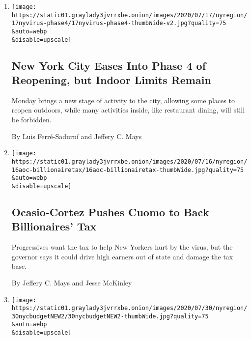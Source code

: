 \begin{enumerate}
\def\labelenumi{\arabic{enumi}.}
\item
  \href{/2020/07/17/nyregion/phase-4-nyc-reopen.html}{}

  \texttt{[image: https://static01.graylady3jvrrxbe.onion/images/2020/07/17/nyregion/17nyvirus-phase4/17nyvirus-phase4-thumbWide-v2.jpg?quality=75\\\&auto=webp\\\&disable=upscale]}

  \hypertarget{new-york-city-eases-into-phase-4-of-reopening-but-indoor-limits-remain}{%
  \subsection{New York City Eases Into Phase 4 of Reopening, but Indoor
  Limits
  Remain}\label{new-york-city-eases-into-phase-4-of-reopening-but-indoor-limits-remain}}

  Monday brings a new stage of activity to the city, allowing some
  places to reopen outdoors, while many activities inside, like
  restaurant dining, will still be forbidden.

  By Luis Ferré-Sadurní and Jeffery C. Mays
\item
  \href{/2020/07/16/nyregion/aoc-billionaires-tax.html}{}

  \texttt{[image: https://static01.graylady3jvrrxbe.onion/images/2020/07/16/nyregion/16aoc-billionairetax/16aoc-billionairetax-thumbWide.jpg?quality=75\\\&auto=webp\\\&disable=upscale]}

  \hypertarget{ocasio-cortez-pushes-cuomo-to-back-billionaires-tax}{%
  \subsection{Ocasio-Cortez Pushes Cuomo to Back Billionaires'
  Tax}\label{ocasio-cortez-pushes-cuomo-to-back-billionaires-tax}}

  Progressives want the tax to help New Yorkers hurt by the virus, but
  the governor says it could drive high earners out of state and damage
  the tax base.

  By Jeffery C. Mays and Jesse McKinley
\item
  \href{/2020/06/30/nyregion/nypd-budget.html}{}

  \texttt{[image: https://static01.graylady3jvrrxbe.onion/images/2020/07/30/nyregion/30nycbudgetNEW2/30nycbudgetNEW2-thumbWide.jpg?quality=75\\\&auto=webp\\\&disable=upscale]}

  \hypertarget{nearly-1-billion-is-shifted-from-police-in-budget-that-pleases-no-one}{%
}
\end{enumerate}
